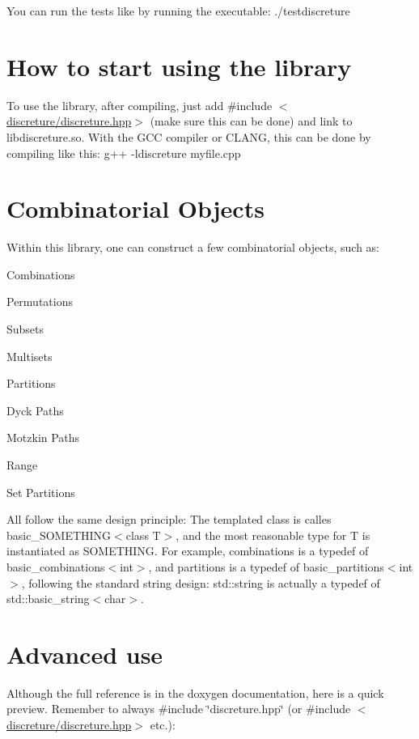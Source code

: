 You can run the tests like by running the executable\-: {\ttfamily ./testdiscreture}

\section*{How to start using the library}

To use the library, after compiling, just add {\ttfamily \#include $<$\hyperlink{discreture_8hpp_source}{discreture/discreture.\-hpp}$>$} (make sure this can be done) and link to {\ttfamily libdiscreture.\-so}. With the G\-C\-C compiler or C\-L\-A\-N\-G, this can be done by compiling like this\-: {\ttfamily g++ -\/ldiscreture myfile.\-cpp}

\section*{Combinatorial Objects}

Within this library, one can construct a few combinatorial objects, such as\-:
\begin{DoxyItemize}
\item Combinations
\item Permutations
\item Subsets
\item Multisets
\item Partitions
\item Dyck Paths
\item Motzkin Paths
\item Range
\item Set Partitions
\end{DoxyItemize}

All follow the same design principle\-: The templated class is calles basic\-\_\-\-S\-O\-M\-E\-T\-H\-I\-N\-G$<$class T$>$, and the most reasonable type for T is instantiated as S\-O\-M\-E\-T\-H\-I\-N\-G. For example, {\ttfamily combinations} is a typedef of {\ttfamily basic\-\_\-combinations$<$int$>$}, and {\ttfamily partitions} is a typedef of {\ttfamily basic\-\_\-partitions$<$int$>$}, following the standard string design\-: std\-::string is actually a typedef of std\-::basic\-\_\-string$<$char$>$.

\section*{Advanced use}

Although the full reference is in the doxygen documentation, here is a quick preview. Remember to always {\ttfamily \#include \char`\"{}discreture.\-hpp\char`\"{}} (or {\ttfamily \#include $<$\hyperlink{discreture_8hpp_source}{discreture/discreture.\-hpp}$>$} etc.)\-:

